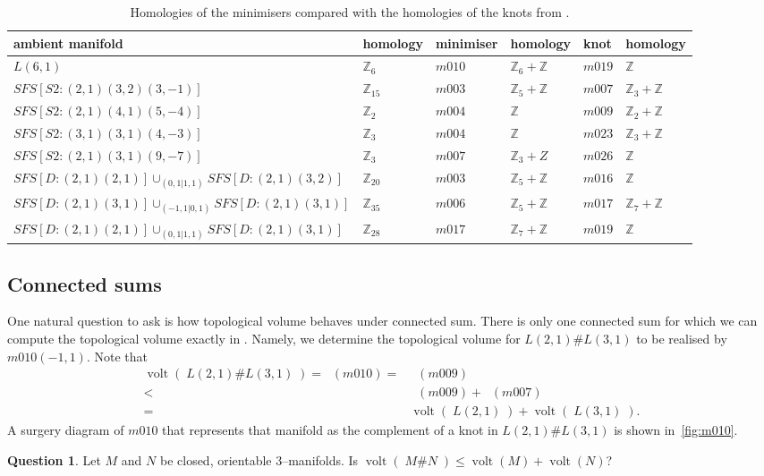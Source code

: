 \documentclass[a4paper]{gtart}
\theoremstyle{definition}
\newtheorem{question}[proposition]{Question}
\theoremstyle{remark}
\numberwithin{equation}{section}
\newcommand{\Z}{\mathbb{Z}}
\DeclareMathOperator{\volt}{volt}
\DeclareMathOperator{\volh}{vol_{\mathbb{H}}}
\begin{document}
\begin{table}[htbp]
	\caption{Homologies of the minimisers compared with the homologies of the knots from .}
	\label{tab:hom}
	\begin{tabular}{llllll}
		 ambient manifold  & homology & minimiser & homology & knot & homology \\
		\toprule
		$L(6,1)$  & $\Z_6$ & $m010$ & $\Z_6 + \Z$& $m019$ & $\Z$  \\
		$SFS [S2: (2,1) (3,2) (3,-1)]$  & $\Z_{15}$ & $m003$ & $\Z_5 + \Z$ & $m007$ & $\Z_3 + \Z$  \\
		$SFS [S2: (2,1) (4,1) (5,-4)]$  & $\Z_2$ & $m004$ & $\Z$ & $m009$ & $ \Z_2+ \Z$  \\
		$SFS [S2: (3,1) (3,1) (4,-3)]$  & $\Z_3$ & $m004$ & $\Z$ & $m023$ & $\Z_3 + \Z$  \\
		$SFS [S2: (2,1) (3,1) (9,-7)]$  & $\Z_3$ & $m007$ & $\Z_3 + Z$ & $m026$ & $\Z$  \\
		$SFS [D: (2,1) (2,1)] \cup_{(0,1 | 1,1)} SFS [D: (2,1) (3,2)]$  & $\Z_{20}$ & $m003$ & $\Z_5 + \Z$ & $m016$ & $\Z$  \\
		$SFS [D: (2,1) (3,1)] \cup_{(-1,1 | 0,1)} SFS [D: (2,1) (3,1)]$  & $\Z_{35}$ & $m006$ & $\Z_5 + \Z$ & $m017$ & $\Z_7 + \Z$  \\
		$SFS [D: (2,1) (2,1)] \cup_{(0,1 | 1,1)} SFS [D: (2,1) (3,1)]$  & $\Z_{28}$ & $m017$ & $\Z_7 + \Z$ & $m019$ & $\Z$  \\
		\bottomrule
	\end{tabular}
\end{table}

\subsection{Connected sums}\label{sec:connected_sum}

One natural question to ask is how topological volume behaves under connected sum. There is only one connected sum 
for which we can compute the topological volume exactly in . Namely, we determine the topological volume
for $L(2,1) \# L(3,1)$ to be realised by $m010(-1, 1)$. Note that 
\begin{align*}
\volt(\; L(2,1) \# L(3,1) \; ) = \volh(m010) =& \volh(m009) \\
<&  \volh(m009) + \volh(m007) \\
=& \volt(\; L(2,1)\;) + \volt(\; L(3,1)\;).
\end{align*}
A surgery diagram of $m010$ that represents that manifold as the complement of a knot in $L(2,1) \# L(3,1)$ is shown in~\cref{fig:m010}.
\begin{question}
Let $M$ and $N$ be closed, orientable 3--manifolds. Is $\volt(\; M \# N \;) \le \volt(M)+\volt(N)$?
\end{question}
\end{document}
